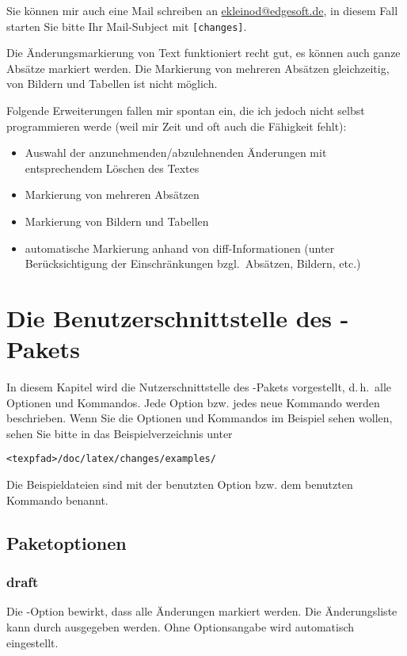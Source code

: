 Sie können mir auch eine Mail schreiben an \href{mailto:ekleinod@edgesoft.de}{ekleinod@edgesoft.de}, in diesem Fall starten Sie bitte Ihr Mail-Subject mit \texttt{[changes]}.

Die Änderungsmarkierung von Text funktioniert recht gut, es können auch ganze Absätze markiert werden.
Die Markierung von mehreren Absätzen gleichzeitig, von Bildern und Tabellen ist nicht möglich.

Folgende Erweiterungen fallen mir spontan ein, die ich jedoch nicht selbst programmieren werde (weil mir Zeit und oft auch die Fähigkeit fehlt):
\begin{itemize}
	\item Auswahl der anzunehmenden/abzulehnenden Änderungen mit entsprechendem Löschen des Textes
	\item Markierung von mehreren Absätzen
	\item Markierung von Bildern und Tabellen
	\item automatische Markierung anhand von diff-Informationen (unter Berücksichtigung der Einschränkungen bzgl.\ Absätzen, Bildern, etc.)
\end{itemize}

\section{Die Benutzerschnittstelle des -Pakets}
\label{sec:user}

In diesem Kapitel wird die Nutzerschnittstelle des -Pakets vorgestellt, d.\,h.\ alle Optionen und Kommandos.
Jede Option bzw. jedes neue Kommando werden beschrieben.
Wenn Sie die Optionen und Kommandos im Beispiel sehen wollen, sehen Sie bitte in das Beispielverzeichnis unter

\texttt{<texpfad>/doc/latex/changes/examples/}

Die Beispieldateien sind mit der benutzten Option bzw. dem benutzten Kommando benannt.

\subsection{Paketoptionen}
\label{sec:user:options}

\subsubsection{draft}

Die -Option bewirkt, dass alle Änderungen markiert werden.
Die Änderungsliste kann durch  ausgegeben werden.
Ohne Optionsangabe wird  automatisch eingestellt.

